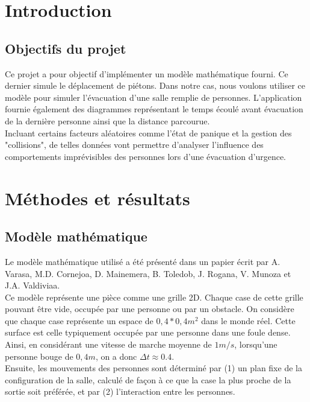 \documentclass[twoside,UTF8]{EPURapport}
\begin{document}
\chapter{Introduction}
	\section{Objectifs du projet}
	Ce projet a pour objectif d'implémenter un modèle mathématique fourni. Ce dernier simule le déplacement de piétons. Dans notre cas, nous voulons utiliser ce modèle pour simuler l'évacuation d'une salle remplie de personnes. L'application fournie également des diagrammes représentant le temps écoulé avant évacuation de la dernière personne ainsi que la distance parcourue.\\
	Incluant certains facteurs aléatoires comme l'état de panique et la gestion des "collisions", de telles données vont permettre d'analyser l'influence des comportements imprévisibles des personnes lors d'une évacuation d'urgence.
	
\chapter{Méthodes et résultats}

	\section{Modèle mathématique}
	Le modèle mathématique utilisé a été présenté dans un papier écrit par A. Varasa, M.D. Cornejoa, D. Mainemera, B. Toledob, J. Rogana, V. Munoza et J.A. Valdiviaa. \\
	Ce modèle représente une pièce comme une grille 2D. Chaque case de cette grille pouvant être vide, occupée par une personne ou par un obstacle. On considère que chaque case représente un espace de $0,4 * 0,4 m^2$ dans le monde réel. Cette surface est celle typiquement occupée par une personne dans une foule dense. Ainsi, en considérant une vitesse de marche moyenne de $1m/s$, lorsqu'une personne bouge de $0,4m$, on a donc $\Delta t \approx 0.4$.\\
	Ensuite, les mouvements des personnes sont déterminé par (1) un plan fixe de la configuration de la salle, calculé de façon à ce que la case la plus proche de la sortie soit préférée, et par (2) l'interaction entre les personnes.
	
\end{document}
